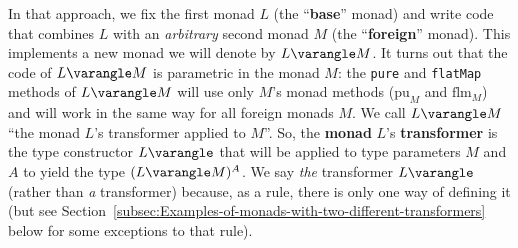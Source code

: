 In that approach, we fix the first monad $L$ (the \textsf{``}\textbf{base}\textsf{''}
monad) and write code that combines $L$ with an \emph{arbitrary}
second monad $M$ (the \textsf{``}\textbf{foreign}\textsf{''} monad). This implements
a new monad we will denote by $L\varangle M$. It turns out that the
code of $L\varangle M$ is parametric in the monad $M$: the \lstinline!pure!
and \lstinline!flatMap! methods of $L\varangle M$ will use only
$M$\textsf{'}s monad methods ($\text{pu}_{M}$ and $\text{flm}_{M}$) and
will work in the same way for all foreign monads $M$. We call $L\varangle M$
\textsf{``}the monad $L$\textsf{'}s transformer applied to $M$\textsf{''}. So, the \textbf{monad}
$L$\textsf{'}s\textbf{ transformer} is the type
constructor $L\varangle$ that will be applied to type parameters
$M$ and $A$ to yield the type $(L\varangle M)^{A}$. We say \emph{the}
transformer $L\varangle$ (rather than \emph{a} transformer) because,
as a rule, there is only one way of defining it (but see Section~\ref{subsec:Examples-of-monads-with-two-different-transformers}
below for some exceptions to that rule).

